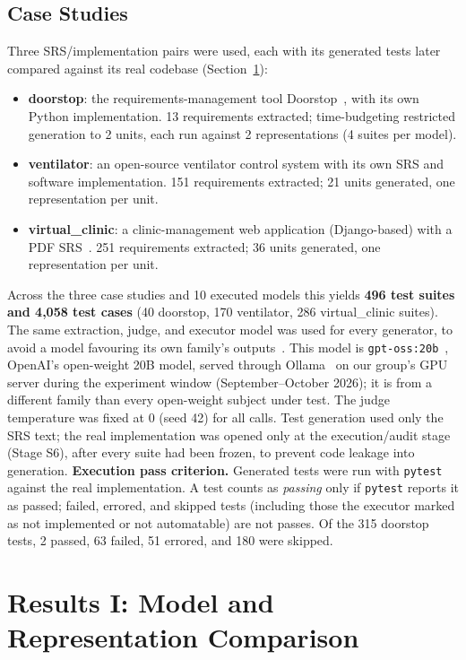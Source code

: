 \documentclass[conference]{IEEEtran}
\begin{document}
\subsection{Case Studies}
Three SRS/implementation pairs were used, each with its generated tests later
compared against its real codebase (Section~\ref{sec:results}):
\begin{itemize}
\item \textbf{doorstop}: the requirements-management tool Doorstop~\cite{browning2014doorstop}, with
its own Python implementation. 13 requirements extracted; time-budgeting
restricted generation to 2 units, each run against 2 representations
(4 suites per model).
\item \textbf{ventilator}: an open-source ventilator control system with
its own SRS and software implementation. 151 requirements extracted; 21
units generated, one representation per unit.
\item \textbf{virtual\_clinic}: a clinic-management web application
(Django-based) with a PDF SRS~\cite{shah2018virtualclinic}. 251 requirements extracted; 36 units
generated, one representation per unit.
\end{itemize}
Across the three case studies and 10 executed models this yields
\textbf{496 test suites and 4{,}058 test cases} (40 doorstop, 170 ventilator,
286 virtual\_clinic suites).
The same extraction, judge, and executor model was used for every generator,
to avoid a model favouring its own family's outputs~\cite{panickssery2024selfpref}. This model is
\texttt{gpt-oss:20b}~\cite{openai2025gptoss}, OpenAI's open-weight 20B model, served through Ollama~\cite{ollama} on
our group's GPU server during the experiment window (September--October 2026);
it is from a different family than every open-weight subject under test. The
judge temperature was fixed at 0 (seed 42) for all calls. Test generation used
only the SRS text; the real implementation was opened only at the
execution/audit stage (Stage S6), after every suite had been frozen, to prevent
code leakage into generation.
\textbf{Execution pass criterion.} Generated tests were run with
\texttt{pytest}~\cite{pytest} against the real implementation. A test counts as \emph{passing}
only if \texttt{pytest} reports it as passed; failed, errored, and skipped tests
(including those the executor marked as not implemented or not automatable) are
not passes. Of the 315 doorstop tests, 2 passed, 63 failed, 51 errored, and 180
were skipped.

\section{Results I: Model and Representation Comparison}
\label{sec:results}
\end{document}
